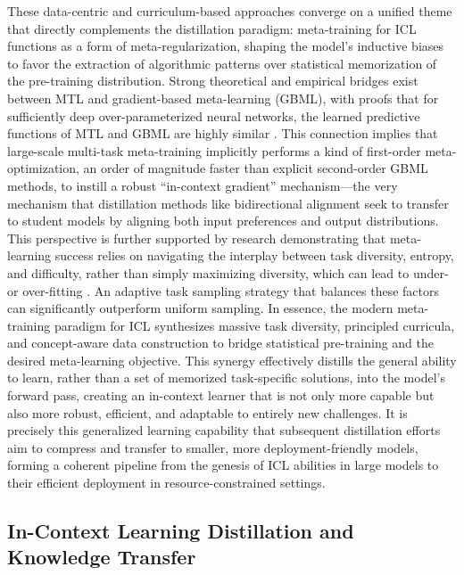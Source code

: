 \documentclass[11pt]{article}
\begin{document}
These data-centric and curriculum-based approaches converge on a unified theme that directly complements the distillation paradigm: meta-training for ICL functions as a form of meta-regularization, shaping the model's inductive biases to favor the extraction of algorithmic patterns over statistical memorization of the pre-training distribution. Strong theoretical and empirical bridges exist between MTL and gradient-based meta-learning (GBML), with proofs that for sufficiently deep over-parameterized neural networks, the learned predictive functions of MTL and GBML are highly similar \cite{ref191}. This connection implies that large-scale multi-task meta-training implicitly performs a kind of first-order meta-optimization, an order of magnitude faster than explicit second-order GBML methods, to instill a robust ``in-context gradient'' mechanism---the very mechanism that distillation methods like bidirectional alignment seek to transfer to student models by aligning both input preferences and output distributions. This perspective is further supported by research demonstrating that meta-learning success relies on navigating the interplay between task diversity, entropy, and difficulty, rather than simply maximizing diversity, which can lead to under- or over-fitting \cite{ref192}. An adaptive task sampling strategy that balances these factors can significantly outperform uniform sampling. In essence, the modern meta-training paradigm for ICL synthesizes massive task diversity, principled curricula, and concept-aware data construction to bridge statistical pre-training and the desired meta-learning objective. This synergy effectively distills the general ability to learn, rather than a set of memorized task-specific solutions, into the model's forward pass, creating an in-context learner that is not only more capable but also more robust, efficient, and adaptable to entirely new challenges. It is precisely this generalized learning capability that subsequent distillation efforts aim to compress and transfer to smaller, more deployment-friendly models, forming a coherent pipeline from the genesis of ICL abilities in large models to their efficient deployment in resource-constrained settings.

\subsection{In-Context Learning Distillation and Knowledge Transfer}
\end{document}

